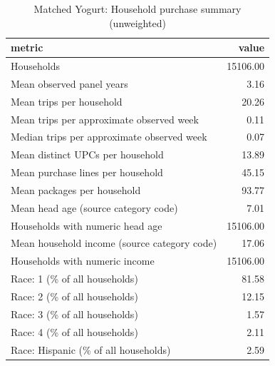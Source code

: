 \begin{table}
\caption{Matched Yogurt: Household purchase summary (unweighted)}
\begin{tabular}{lr}
\toprule
metric & value \\
\midrule
Households & 15106.00 \\
Mean observed panel years & 3.16 \\
Mean trips per household & 20.26 \\
Mean trips per approximate observed week & 0.11 \\
Median trips per approximate observed week & 0.07 \\
Mean distinct UPCs per household & 13.89 \\
Mean purchase lines per household & 45.15 \\
Mean packages per household & 93.77 \\
Mean head age (source category code) & 7.01 \\
Households with numeric head age & 15106.00 \\
Mean household income (source category code) & 17.06 \\
Households with numeric income & 15106.00 \\
Race: 1 (\% of all households) & 81.58 \\
Race: 2 (\% of all households) & 12.15 \\
Race: 3 (\% of all households) & 1.57 \\
Race: 4 (\% of all households) & 2.11 \\
Race: Hispanic (\% of all households) & 2.59 \\
\bottomrule
\end{tabular}
\end{table}
